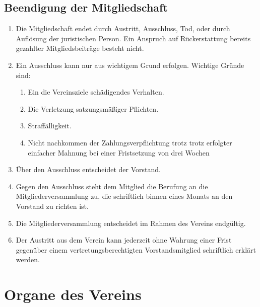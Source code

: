 \documentclass[12pt,a4paper,draft]{article}
\begin{document}
\subsection{Beendigung der Mitgliedschaft} %
\begin{enumerate}
\item Die Mitgliedschaft endet durch Austritt, Ausschluss, Tod, oder durch 
Auflösung der juristischen Person. Ein Anspruch auf Rückerstattung bereits 
gezahlter Mitgliedsbeiträge besteht nicht.

\item Ein Ausschluss kann nur aus wichtigem Grund erfolgen. 
Wichtige Gründe sind:

\begin{enumerate}
\item Ein die Vereinsziele schädigendes Verhalten.

\item Die Verletzung satzungsmäßiger Pflichten.

\item Straffälligkeit.
 
\item Nicht nachkommen der Zahlungsverpflichtung trotz trotz erfolgter 
einfacher Mahnung bei einer Fristsetzung von drei Wochen
\end{enumerate}

\item Über den Ausschluss entscheidet der Vorstand.

\item Gegen den Ausschluss steht dem Mitglied die Berufung an die 
Mitgliederversammlung zu, die schriftlich binnen eines Monats an den Vorstand 
zu richten ist.

\item Die Mitgliederversammlung entscheidet im Rahmen des Vereins endgültig.

\item Der Austritt aus dem Verein kann jederzeit ohne Wahrung einer Frist 
gegenüber einem vertretungsberechtigten Vorstandsmitglied schriftlich erklärt 
werden. %
\end{enumerate}

\section{Organe des Vereins}
\end{document}
